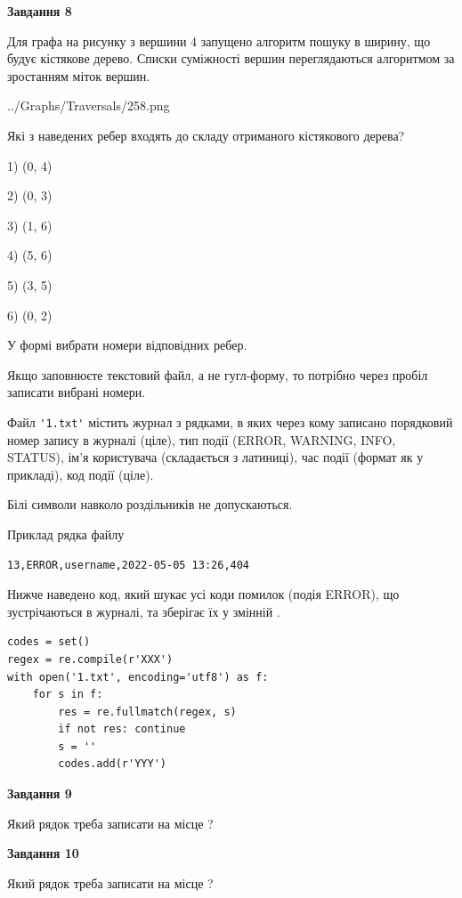 \documentclass[12pt, ukrainian]{article}
\def\code#1{\Verb!#1!}
\begin{document}
{\begin {large}
{\begin {center}\textbf{Завдання 8}\end {center}}\par
Для графа на рисунку з вершини 4 запущено алгоритм пошуку в ширину, що будує кістякове дерево. Списки суміжності вершин переглядаються алгоритмом за зростанням міток вершин.\par
\begin{center}
	{../Graphs/Traversals/258.png}
\end{center}
\par Які з наведених ребер входять до складу отриманого кістякового дерева?\par
1) (0, 4)\par
2) (0, 3)\par
3) (1, 6)\par
4) (5, 6)\par
5) (3, 5)\par
6) (0, 2)\par
{\vskip 15pt} У формі вибрати номери відповідних ребер.


Якщо заповнюєте текстовий файл, а не гугл-форму, то потрібно через пробіл записа\-ти вибрані номери.\par
\newpage


Файл \code{'1.txt'} містить журнал з рядками, в яких через кому записано поряд\-ко\-вий номер запису в журналі (ціле), тип події (ERROR, WARNING, INFO, STATUS), ім'я користувача (складається з латиниці), час події (фор\-мат як у прикладі), код події (ціле).

Білі символи навколо роздільників не допускаються.

Приклад рядка файлу



\begin{verbatim}
13,ERROR,username,2022-05-05 13:26,404
\end{verbatim}


Нижче наведено код, який шукає усі коди помилок (подія ERROR), що зустріча\-ють\-ся в журналі, та зберігає їх у змінній .



\begin{verbatim}
codes = set()
regex = re.compile(r'XXX')
with open('1.txt', encoding='utf8') as f:
    for s in f:
        res = re.fullmatch(regex, s)
        if not res: continue
        s = ''
        codes.add(r'YYY')
\end{verbatim}


{\begin {center}\textbf{Завдання 9}\end {center}}\par
Який рядок треба записати на місце  ?\par
\vspace{5mm}


{\begin {center}\textbf{Завдання 10}\end {center}}\par
Який рядок треба записати на місце  ?\par


\newpage


\end {large}}
\end{document}

